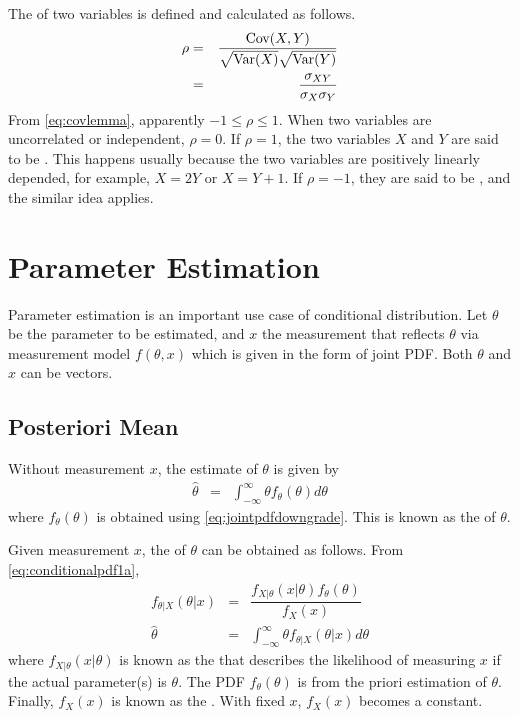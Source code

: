 The  of two variables is defined and calculated as follows.
\begin{eqnarray}
	\rho &=& \dfrac{\textup{Cov}(X, Y)}{\sqrt{\textup{Var}(X)}\sqrt{\textup{Var}(Y)}} \nonumber \\
	&=& \dfrac{\sigma_{XY}}{\sigma_X\sigma_Y} \nonumber
\end{eqnarray}
From \eqref{eq:covlemma}, apparently $-1\leq \rho \leq 1$. When two variables are uncorrelated or independent, $\rho=0$. If $\rho=1$, the two variables $X$ and $Y$ are said to be . This happens usually because the two variables are positively linearly depended, for example, $X=2Y$ or $X=Y+1$. If $\rho=-1$, they are said to be , and the similar idea applies.

\section{Parameter Estimation}

Parameter estimation is an important use case of conditional distribution. Let $\theta$ be the parameter to be estimated, and $x$ the measurement that reflects $\theta$ via measurement model $f(\theta, x)$ which is given in the form of joint PDF. Both $\theta$ and $x$ can be vectors.

\subsection{Posteriori Mean}

Without measurement $x$, the estimate of $\theta$ is given by
\begin{eqnarray}
	\hat{\theta} &=& \int_{-\infty}^{\infty} \theta f_\theta(\theta) d\theta \nonumber
\end{eqnarray}
where $f_\theta(\theta)$ is obtained using \eqref{eq:jointpdfdowngrade}. This is known as the  of $\theta$. 

Given measurement $x$, the  of $\theta$ can be obtained as follows. From \eqref{eq:conditionalpdf1a},
\begin{eqnarray}
	f_{\theta|X}(\theta|x) &=& \dfrac{f_{X|\theta}(x|\theta)f_\theta(\theta)}{f_X(x)} \label{eq:conditionalpdf2} \\
	\hat{\theta} &=& \int_{-\infty}^{\infty} \theta f_{\theta|X}(\theta|x) d\theta \label{eq:posterioriestimation}
\end{eqnarray}
where $f_{X|\theta}(x|\theta)$ is known as the  that describes the likelihood of measuring $x$ if the actual parameter(s) is $\theta$. The PDF $f_\theta(\theta)$ is from the priori estimation of $\theta$. Finally, $f_X(x)$ is known as the . With fixed $x$, $f_X(x)$ becomes a constant.

